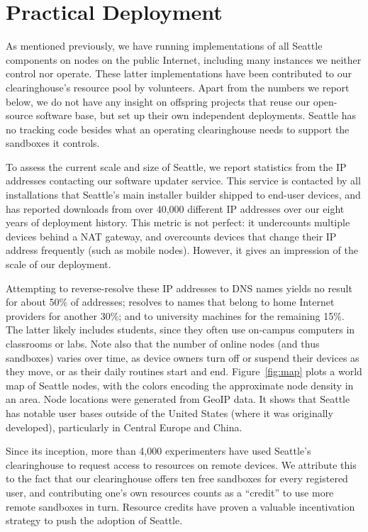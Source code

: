 \section{Practical Deployment}\label{sec-deployment}

As mentioned previously, we have running implementations of all
Seattle components on nodes on the public Internet, including
many instances we neither control nor operate. These latter
implementations have been
contributed to our clearinghouse's resource pool by volunteers.
Apart from the numbers we report below, we do not have any
insight on offspring projects that reuse our open-source software
base, but set up their own independent deployments.
Seattle has no tracking code besides what an operating clearinghouse
needs to support the sandboxes it controls.

To assess the current scale and size of Seattle, we report
statistics from the \gls{IP} addresses contacting our software
updater service. This service is contacted
by all installations that Seattle's main installer builder shipped
to end-user devices, and has reported downloads from over 40,000
different \gls{IP} addresses over our eight years of deployment history.
This metric is not perfect: it undercounts multiple devices behind
a \gls{NAT} gateway, and overcounts devices that change their
\gls{IP} address frequently (such as mobile nodes). However, it
gives an impression of the scale of our deployment.

Attempting to reverse-resolve these \gls{IP} addresses to \gls{DNS}
names yields no result for about 50\% of addresses; resolves to
names that belong to home Internet providers for another 30\%; and to university
machines for the remaining 15\%. The latter likely includes students, since they
often use on-campus computers in classrooms or labs. Note also that the number
of online nodes (and thus sandboxes) varies over time, as device owners
turn off or suspend their devices as they move, or as their daily
routines start and end.
Figure~\ref{fig:map} plots a world map of Seattle nodes, with the
colors encoding the approximate node density in an area.
Node locations were generated from GeoIP data.
It shows that Seattle has notable user bases outside of the
United States (where it was originally developed),
particularly in Central Europe and China.

Since its inception,
more than 4,000 experimenters have used Seattle's clearinghouse
to request access to resources on remote devices. We attribute this
to the fact that our clearinghouse offers ten free sandboxes for
every registered user, and contributing one's own resources counts
as a ``credit'' to use more remote sandboxes in turn.
Resource credits have proven a valuable incentivation strategy
to push the adoption of Seattle.

